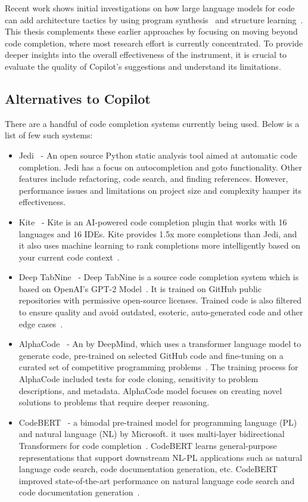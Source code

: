 Recent work shows initial investigations on how large language models for code can add architecture tactics by using program synthesis~\cite{Shokri2021, jigsaw} and structure learning~\cite{Karmakar2021}.
This thesis complements these earlier approaches by focusing on moving beyond code completion, where most research effort is currently concentrated.
To provide deeper insights into the overall effectiveness of the instrument, it is crucial to evaluate the quality of Copilot's suggestions and understand its limitations.

\subsection{Alternatives to Copilot}
There are a handful of code completion systems currently being used. Below is a list of few such systems:

\begin{itemize}
    \item Jedi~\cite{jedi} - An open source Python static analysis tool aimed at automatic code completion. Jedi has a focus on autocompletion and goto functionality. Other features include refactoring, code search, and finding references. However, performance issues and limitations on project size and complexity hamper its effectiveness.
    \item Kite~\cite{kite} - Kite is an AI-powered code completion plugin that works with 16 languages and 16 IDEs. Kite provides 1.5x more completions than Jedi, and it also uses machine learning to rank completions more intelligently based on your current code context~\cite{kite}.
    \item Deep TabNine~\cite{tabnine} - Deep TabNine is a source code completion system which is based on OpenAI's GPT-2 Model~\cite{gpt2}. It is trained on GitHub public repositories with permissive open-source licenses. Trained code is also filtered to ensure quality and avoid outdated, esoteric, auto-generated code and other edge cases~\cite{tabnine}.
    \item AlphaCode~\cite{alphacode} - An \cct{} by DeepMind, which uses a transformer language model to generate code, pre-trained on selected GitHub code and fine-tuning on a curated set of competitive programming problems~\cite{alphacode}. The training process for AlphaCode included tests for code cloning, sensitivity to problem descriptions, and metadata. AlphaCode model focuses on creating novel solutions to problems that require deeper reasoning. 
    \item CodeBERT~\cite{codebert} - a bimodal pre-trained model for programming language (PL) and natural language (NL) by Microsoft. it uses multi-layer bidirectional Transformers for code completion~\cite{codebert}. CodeBERT learns general-purpose representations that support downstream NL-PL applications such as natural language code search, code documentation generation, etc. CodeBERT improved state-of-the-art performance on natural language code search and code documentation generation~\cite{codebert}.
\end{itemize}
